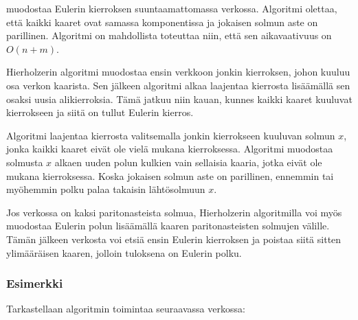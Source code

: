  muodostaa Eulerin kierroksen
suuntaamattomassa verkossa.
Algoritmi olettaa, että kaikki kaaret ovat samassa
komponentissa ja jokaisen solmun aste on parillinen.
Algoritmi on mahdollista toteuttaa niin, että sen
aikavaativuus on $O(n+m)$.

Hierholzerin algoritmi muodostaa ensin verkkoon jonkin kierroksen,
johon kuuluu osa verkon kaarista.
Sen jälkeen algoritmi alkaa laajentaa kierrosta
lisäämällä sen osaksi uusia alikierroksia.
Tämä jatkuu niin kauan, kunnes kaikki kaaret kuuluvat
kierrokseen ja siitä on tullut Eulerin kierros.

Algoritmi laajentaa kierrosta valitsemalla jonkin
kierrokseen kuuluvan solmun $x$,
jonka kaikki kaaret eivät ole vielä mukana kierroksessa.
Algoritmi muodostaa solmusta $x$ alkaen uuden polun
kulkien vain sellaisia kaaria, jotka eivät ole
mukana kierroksessa.
Koska jokaisen solmun aste on parillinen,
ennemmin tai myöhemmin polku palaa takaisin lähtösolmuun $x$.

Jos verkossa on kaksi paritonasteista solmua,
Hierholzerin algoritmilla voi myös muodostaa
Eulerin polun lisäämällä kaaren
paritonasteisten solmujen välille.
Tämän jälkeen verkosta voi etsiä ensin
Eulerin kierroksen ja poistaa siitä sitten
ylimääräisen kaaren, jolloin tuloksena on Eulerin polku.

\subsubsection{Esimerkki}

\begin{samepage}
Tarkastellaan algoritmin toimintaa seuraavassa verkossa:
\begin{center}
\end{center}
\end{samepage}

